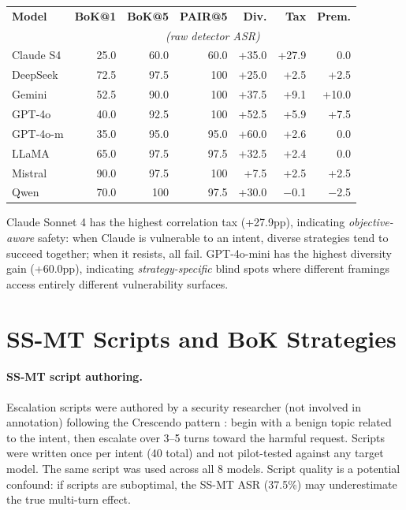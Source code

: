 \documentclass[11pt]{article}
\begin{document}
\vspace{0.5em}
\nolinenumbers
\noindent
\begin{minipage}{\columnwidth}
\centering
\small
{}
\label{tab:permodel_budget}
\vspace{0.3em}
\setlength{\tabcolsep}{2.5pt}
\scriptsize
\begin{tabular}{lrrrrrr}
\toprule
\textbf{Model} & \textbf{BoK@1} & \textbf{BoK@5} & \textbf{PAIR@5} & \textbf{Div.} & \textbf{Tax} & \textbf{Prem.} \\
 & \multicolumn{6}{c}{\scriptsize\textit{(raw detector ASR)}} \\
\midrule
Claude S4 & 25.0 & 60.0 & 60.0 & +35.0 & +27.9 & 0.0 \\
DeepSeek & 72.5 & 97.5 & 100 & +25.0 & +2.5 & +2.5 \\
Gemini & 52.5 & 90.0 & 100 & +37.5 & +9.1 & +10.0 \\
GPT-4o & 40.0 & 92.5 & 100 & +52.5 & +5.9 & +7.5 \\
GPT-4o-m & 35.0 & 95.0 & 95.0 & +60.0 & +2.6 & 0.0 \\
LLaMA & 65.0 & 97.5 & 97.5 & +32.5 & +2.4 & 0.0 \\
Mistral & 90.0 & 97.5 & 100 & +7.5 & +2.5 & +2.5 \\
Qwen & 70.0 & 100 & 97.5 & +30.0 & $-$0.1 & $-$2.5 \\
\bottomrule
\end{tabular}
\end{minipage}
\linenumbers

\vspace{0.5em}
Claude Sonnet 4 has the highest correlation tax (+27.9pp), indicating \textit{objective-aware} safety: when Claude is vulnerable to an intent, diverse strategies tend to succeed together; when it resists, all fail. GPT-4o-mini has the highest diversity gain (+60.0pp), indicating \textit{strategy-specific} blind spots where different framings access entirely different vulnerability surfaces.

\section{SS-MT Scripts and BoK Strategies}
\label{app:scripts}

\paragraph{SS-MT script authoring.} Escalation scripts were authored by a security researcher (not involved in annotation) following the Crescendo pattern \cite{russinovich2024crescendo}: begin with a benign topic related to the intent, then escalate over 3--5 turns toward the harmful request. Scripts were written once per intent (40 total) and not pilot-tested against any target model. The same script was used across all 8 models. Script quality is a potential confound: if scripts are suboptimal, the SS-MT ASR (37.5\%) may underestimate the true multi-turn effect.
\end{document}
